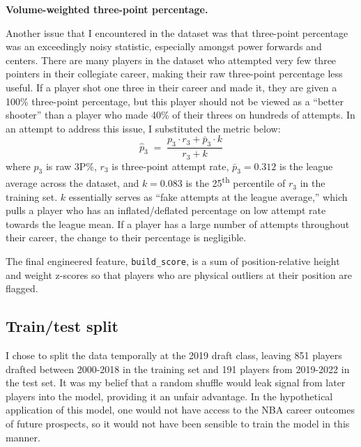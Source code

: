 \documentclass[conference]{IEEEtran}
\begin{document}
\noindent \textbf{Volume-weighted three-point percentage.}

Another issue that I encountered in the dataset was that three-point percentage was an exceedingly noisy statistic, especially amongst power forwards and centers. There are many players in the dataset who attempted very few three pointers in their collegiate career, making their raw three-point percentage less useful. If a player shot one three in their career and made it, they are given a 100\% three-point percentage, but this player should not be viewed as a ``better shooter'' than a player who made 40\% of their threes on hundreds of attempts. In an attempt to address this issue, I substituted the metric below:
\begin{equation}
\widehat{p}_3 \;=\;
\frac{p_3 \cdot r_3 + \bar{p}_3 \cdot k}{r_3 + k}
\end{equation}
where $p_3$ is raw 3P\%, $r_3$ is three-point attempt rate,
$\bar{p}_3 = 0.312$ is the league average across the dataset, and
$k = 0.083$ is the 25\textsuperscript{th} percentile of $r_3$ in the
training set. $k$ essentially serves as ``fake attempts at the league average,'' which pulls a player who has an inflated/deflated percentage on low attempt rate towards the league mean. If a player has a large number of attempts throughout their career, the change to their percentage is negligible.

The final engineered feature, \texttt{build\_score}, is a sum of position-relative height and weight z-scores so that players who are physical outliers at their position are flagged.

\subsection{Train/test split}

I chose to split the data temporally at the 2019 draft class, leaving 851 players drafted between 2000-2018 in the training set and 191 players from 2019-2022 in the test set. It was my belief that a random shuffle would leak signal from later players into the model, providing it an unfair advantage. In the hypothetical application of this model, one would not have access to the NBA career outcomes of future prospects, so it would not have been sensible to train the model in this manner.
\end{document}
